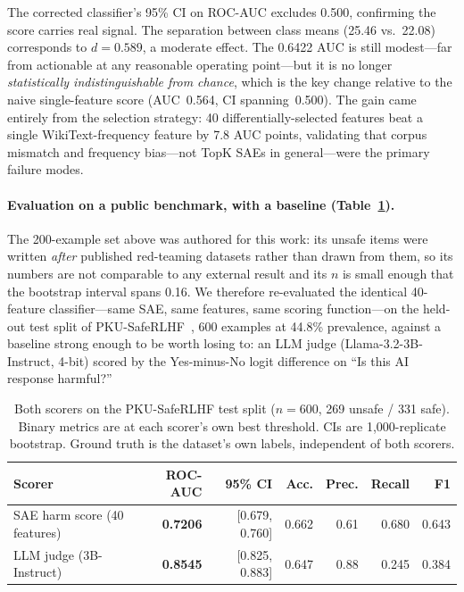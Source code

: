 \documentclass[11pt]{article}
\begin{document}
The corrected classifier's 95\% CI on ROC-AUC excludes 0.500, confirming the score carries real signal. The separation between class means (25.46 vs.\ 22.08) corresponds to $d = 0.589$, a moderate effect. The 0.6422 AUC is still modest---far from actionable at any reasonable operating point---but it is no longer \emph{statistically indistinguishable from chance}, which is the key change relative to the naive single-feature score (AUC~0.564, CI spanning~0.500). The gain came entirely from the selection strategy: 40 differentially-selected features beat a single WikiText-frequency feature by 7.8 AUC points, validating that corpus mismatch and frequency bias---not TopK SAEs in general---were the primary failure modes.

\paragraph{Evaluation on a public benchmark, with a baseline (Table~\ref{tab:v3}).}
The 200-example set above was authored for this work: its unsafe items were written
\emph{after} published red-teaming datasets rather than drawn from them, so its numbers
are not comparable to any external result and its $n$ is small enough that the bootstrap
interval spans 0.16. We therefore re-evaluated the identical 40-feature classifier---same
SAE, same features, same scoring function---on the held-out test split of
PKU-SafeRLHF~\citep{ji2023beavertails}, 600 examples at 44.8\% prevalence, against a
baseline strong enough to be worth losing to: an LLM judge (Llama-3.2-3B-Instruct, 4-bit)
scored by the Yes-minus-No logit difference on ``Is this AI response harmful?''

\begin{table}[h]
\centering
\caption{Both scorers on the PKU-SafeRLHF test split ($n = 600$, 269 unsafe / 331 safe).
Binary metrics are at each scorer's own best threshold. CIs are 1,000-replicate bootstrap.
Ground truth is the dataset's own labels, independent of both scorers.}
\label{tab:v3}
\begin{tabular}{@{}lrrrrrr@{}}
\toprule
Scorer & ROC-AUC & 95\% CI & Acc. & Prec. & Recall & F1 \\
\midrule
SAE harm score (40 features) & \textbf{0.7206} & [0.679, 0.760] & 0.662 & 0.61 & 0.680 & 0.643 \\
LLM judge (3B-Instruct)      & \textbf{0.8545} & [0.825, 0.883] & 0.647 & 0.88 & 0.245 & 0.384 \\
\bottomrule
\end{tabular}
\end{table}
\end{document}
